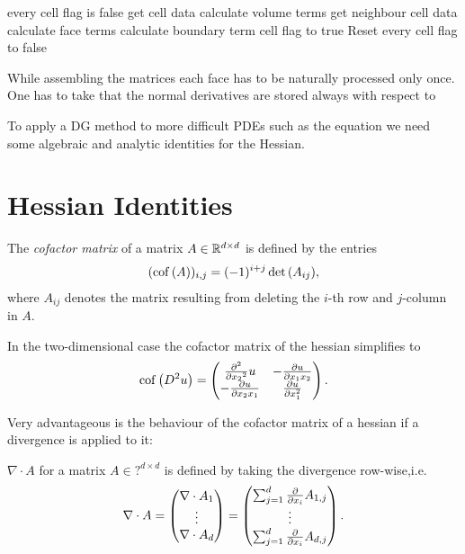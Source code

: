 \begin{algorithmic}
\Ensure every cell flag is false
\State get cell data
\State calculate volume terms
					\State get neighbour cell data
					\State calculate face terms
			\EndIf
		\Else
			\State calculate boundary term
		\EndIf
\EndFor
	\State cell flag to true 
\EndFor
\State Reset every cell flag to false
\end{algorithmic}

While assembling the matrices each face has to be naturally processed only once. One has to take that the normal derivatives are stored always with respect to 

\newpage

To apply a DG method to more difficult PDEs such as the \MA equation we need some algebraic and analytic identities for the Hessian.
\section{Hessian Identities}

\begin{definition} \label{def: cof matrix}
	The \emph{cofactor matrix} of a matrix $A \in \mathbb{R}^{d \times d}$ is defined by the entries
	\begin{align}
	(\operatorname{cof} \left( A \right) )_{i,j} = (-1)^{i+j} \det{\left(A_{ij}\right)},
	\end{align}
	where $A_{ij}$ denotes the matrix resulting from deleting the $i$-th row and $j$-column in $A$.
\end{definition}

In the two-dimensional case the cofactor matrix of the hessian simplifies to
\begin{align}
\operatorname{cof} \left( D^2 u \right) = \begin{pmatrix}
								\frac {\partial^2} {\partial {x_2}^2} u & -\frac {\partial u}{\partial x_1 x_2} \\
								-\frac {\partial u}{\partial x_2 x_1} & \frac {\partial u}{\partial x_1^2} 
							\end{pmatrix}.
\end{align}


Very advantageous is the behaviour of the cofactor matrix of a hessian if a divergence is applied to it:
\begin{definition}
	$\nabla \cdot A$ for a matrix $A \in ?^{d \times d}$ is defined by taking the divergence row-wise,i.e.
\[
	\nabla \cdot A = \begin{pmatrix} \nabla \cdot A_1 \\ \vdots \\ \nabla \cdot A_d\end{pmatrix}
	= \begin{pmatrix} \sum_{j = 1}^{d} \frac \partial {\partial x_i} A_{1,j} \\ \vdots \\ \sum_{j = 1}^{d} \frac \partial {\partial x_i} A_{d,j}\end{pmatrix}.
\]
	
\end{definition}

